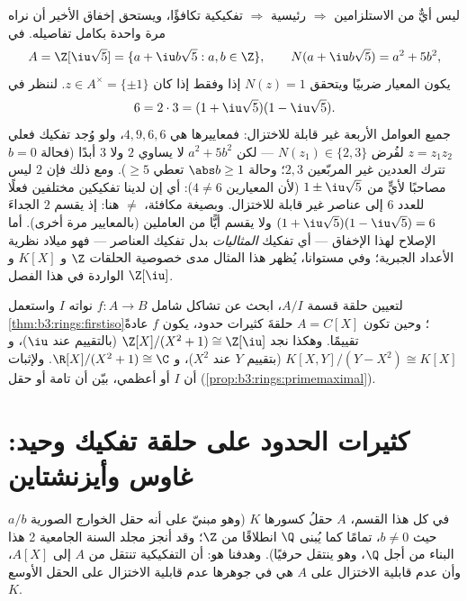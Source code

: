 \begin{example}
\label{ex:b3:rings:nonufd}
ليس أيٌّ من الاستلزامين  $\Rightarrow$ رئيسية
$\Rightarrow$ تفكيكية تكافؤًا، ويستحق إخفاق الأخير أن نراه مرة
واحدة بكامل تفاصيله. في
\[
A = \Z[\iu\sqrt5] = \{a + \iu b\sqrt5 : a, b \in \Z\},
\qquad N(a + \iu b\sqrt5) = a^2 + 5b^2,
\]
يكون المعيار ضربيًا ويتحقق $N(z) = 1$ إذا وفقط إذا كان $z \in
A^\times = \{\pm1\}$.
لننظر في
\[
6 = 2 \cdot 3 = (1 + \iu\sqrt5)(1 - \iu\sqrt5).
\]
جميع العوامل الأربعة غير قابلة للاختزال: فمعاييرها هي $4, 9, 6,
6$،
ولو وُجد تفكيك فعلي $z = z_1z_2$ لفُرض $N(z_1) \in \{2, 3\}$ --- لكن
$a^2 + 5b^2$ لا يساوي $2$ ولا $3$ أبدًا (فحالة $b = 0$ تترك
العددين غير المربّعين $2, 3$؛ وحالة $\abs b \geq
1$ تعطي $\geq 5$).
ومع ذلك فإن $2$ ليس مصاحبًا لأيٍّ من $1 \pm
\iu\sqrt5$ (لأن المعيارين
$4 \neq 6$): أي إن لدينا تفكيكين مختلفين فعلًا للعدد $6$ إلى
عناصر غير قابلة للاختزال. وبصيغة مكافئة، 
$\neq$  هنا: إذ يقسم $2$ الجداءَ $(1 +
\iu\sqrt5)(1 - \iu\sqrt5) = 6$ ولا يقسم أيًّا
من العاملين (بالمعايير مرة أخرى). أما الإصلاح  لهذا
الإخفاق --- أي تفكيك \emph{المثاليات} بدل تفكيك العناصر ---
فهو ميلاد نظرية الأعداد الجبرية؛ وفي مستوانا، يُظهر هذا المثال
مدى خصوصية الحلقات  $\Z$ و $K[X]$ و $\Z[\iu]$ الواردة
في هذا الفصل.
\end{example}

\begin{method}\label{met:b3:rings:quotient}
لتعيين حلقة قسمة $A/I$، ابحث عن تشاكل شامل $f \colon A \to B$ نواته $I$
واستعمل \cref{thm:b3:rings:firstiso}؛ وحين تكون $A = C[X]$ حلقةَ كثيرات حدود،
يكون $f$ عادةً تقييمًا. وهكذا نجد $\Z[X]/(X^2+1) \cong
\Z[\iu]$ (بالتقييم عند $\iu$)،
و $K[X,Y]/(Y - X^2) \cong K[X]$ (بتقييم $Y$ عند $X^2$)، و $\R[X]/(X^2+1) \cong \C$. ولإثبات أن $I$
 أو أعظمي، بيّن أن  تامة أو حقل (\cref{prop:b3:rings:primemaximal}).
\end{method}

\section{كثيرات الحدود على حلقة تفكيك وحيد: غاوس وأيزنشتاين}

في كل هذا القسم، $A$  حقلُ كسورها $K$ (وهو مبنيّ
على أنه حقل الخوارج الصورية $a/b$ حيث $b \neq 0$، تمامًا كما
يُبنى $\Q$ انطلاقًا من $\Z$؛ وقد أنجز مجلد السنة الجامعية 2 هذا
البناء من أجل $\Q$، وهو ينتقل حرفيًا). وهدفنا هو: أن التفكيكية
تنتقل من $A$ إلى $A[X]$، وأن عدم قابلية الاختزال على $A$ هي في
جوهرها عدم قابلية الاختزال على الحقل الأوسع $K$.

